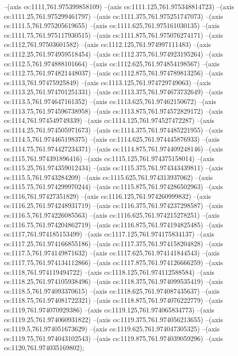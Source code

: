--(axis cs:1111,761.975399858109)
--(axis cs:1111.125,761.975348814723)
--(axis cs:1111.25,761.975299461797)
--(axis cs:1111.375,761.975251747073)
--(axis cs:1111.5,761.975205619655)
--(axis cs:1111.625,761.975161030135)
--(axis cs:1111.75,761.975117930515)
--(axis cs:1111.875,761.975076274171)
--(axis cs:1112,761.97503601582)
--(axis cs:1112.125,761.974997111483)
--(axis cs:1112.25,761.974959518454)
--(axis cs:1112.375,761.974923195264)
--(axis cs:1112.5,761.974888101664)
--(axis cs:1112.625,761.974854198567)
--(axis cs:1112.75,761.974821448037)
--(axis cs:1112.875,761.974789813256)
--(axis cs:1113,761.97475925849)
--(axis cs:1113.125,761.974729749063)
--(axis cs:1113.25,761.974701251331)
--(axis cs:1113.375,761.974673732649)
--(axis cs:1113.5,761.974647161352)
--(axis cs:1113.625,761.97462150672)
--(axis cs:1113.75,761.974596738958)
--(axis cs:1113.875,761.974572829172)
--(axis cs:1114,761.974549749339)
--(axis cs:1114.125,761.974527472287)
--(axis cs:1114.25,761.974505971673)
--(axis cs:1114.375,761.974485221955)
--(axis cs:1114.5,761.974465198375)
--(axis cs:1114.625,761.974445876933)
--(axis cs:1114.75,761.974427234371)
--(axis cs:1114.875,761.974409248146)
--(axis cs:1115,761.974391896416)
--(axis cs:1115.125,761.974375158014)
--(axis cs:1115.25,761.974359012434)
--(axis cs:1115.375,761.974343439811)
--(axis cs:1115.5,761.9743284209)
--(axis cs:1115.625,761.974313937062)
--(axis cs:1115.75,761.974299970244)
--(axis cs:1115.875,761.974286502963)
--(axis cs:1116,761.97427351829)
--(axis cs:1116.125,761.974260999832)
--(axis cs:1116.25,761.974248931719)
--(axis cs:1116.375,761.974237298587)
--(axis cs:1116.5,761.974226085563)
--(axis cs:1116.625,761.974215278251)
--(axis cs:1116.75,761.974204862719)
--(axis cs:1116.875,761.974194825485)
--(axis cs:1117,761.974185153499)
--(axis cs:1117.125,761.974175834137)
--(axis cs:1117.25,761.974166855186)
--(axis cs:1117.375,761.974158204828)
--(axis cs:1117.5,761.974149871632)
--(axis cs:1117.625,761.974141844543)
--(axis cs:1117.75,761.974134112866)
--(axis cs:1117.875,761.974126666259)
--(axis cs:1118,761.974119494722)
--(axis cs:1118.125,761.974112588584)
--(axis cs:1118.25,761.974105938496)
--(axis cs:1118.375,761.974099535419)
--(axis cs:1118.5,761.974093370615)
--(axis cs:1118.625,761.974087435637)
--(axis cs:1118.75,761.974081722321)
--(axis cs:1118.875,761.974076222779)
--(axis cs:1119,761.974070929386)
--(axis cs:1119.125,761.974065834773)
--(axis cs:1119.25,761.974060931822)
--(axis cs:1119.375,761.974056213655)
--(axis cs:1119.5,761.974051673629)
--(axis cs:1119.625,761.974047305325)
--(axis cs:1119.75,761.974043102543)
--(axis cs:1119.875,761.974039059296)
--(axis cs:1120,761.974035169802);

